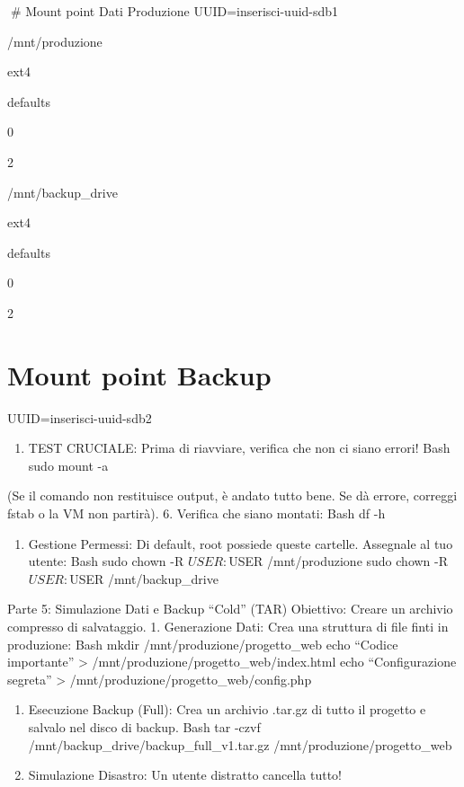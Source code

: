 \documentclass[11pt,a4paper]{article}
\providecommand{\tightlist}{%
  \setlength{\itemsep}{0pt}\setlength{\parskip}{0pt}}
\begin{document}
\# Mount point Dati Produzione UUID=inserisci-uuid-sdb1

/mnt/produzione

ext4

defaults

0

2

/mnt/backup\_drive

ext4

defaults

0

2

\section{Mount point Backup}\label{mount-point-backup}

UUID=inserisci-uuid-sdb2

\begin{enumerate}
\def\labelenumi{\arabic{enumi}.}
\setcounter{enumi}{4}
\tightlist
\item
  TEST CRUCIALE: Prima di riavviare, verifica che non ci siano errori!
  Bash sudo mount -a
\end{enumerate}

(Se il comando non restituisce output, è andato tutto bene. Se dà
errore, correggi fstab o la VM non partirà). 6. Verifica che siano
montati: Bash df -h

\begin{enumerate}
\def\labelenumi{\arabic{enumi}.}
\setcounter{enumi}{6}
\tightlist
\item
  Gestione Permessi: Di default, root possiede queste cartelle.
  Assegnale al tuo utente: Bash sudo chown -R \(USER:\)USER
  /mnt/produzione sudo chown -R \(USER:\)USER /mnt/backup\_drive
\end{enumerate}

Parte 5: Simulazione Dati e Backup ``Cold'' (TAR) Obiettivo: Creare un
archivio compresso di salvataggio. 1. Generazione Dati: Crea una
struttura di file finti in produzione: Bash mkdir
/mnt/produzione/progetto\_web echo ``Codice importante'' \textgreater{}
/mnt/produzione/progetto\_web/index.html echo ``Configurazione segreta''
\textgreater{} /mnt/produzione/progetto\_web/config.php

\begin{enumerate}
\def\labelenumi{\arabic{enumi}.}
\setcounter{enumi}{1}
\item
  Esecuzione Backup (Full): Crea un archivio .tar.gz di tutto il
  progetto e salvalo nel disco di backup. Bash tar -czvf
  /mnt/backup\_drive/backup\_full\_v1.tar.gz
  /mnt/produzione/progetto\_web
\item
  Simulazione Disastro: Un utente distratto cancella tutto!
\end{enumerate}
\end{document}
